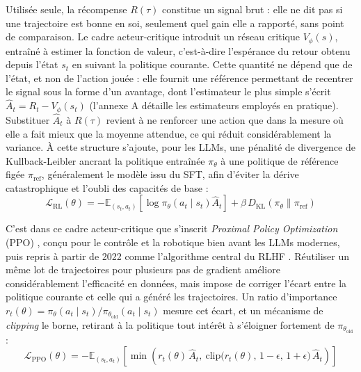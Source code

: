\documentclass[11pt,a4paper]{article}
\begin{document}
Utilisée seule, la récompense $R(\tau)$ constitue un signal brut : elle ne dit pas si une trajectoire est bonne en soi, seulement quel gain elle a rapporté, sans point de comparaison. Le cadre acteur-critique introduit un réseau critique $V_\phi(s)$, entraîné à estimer la fonction de valeur, c'est-à-dire l'espérance du retour obtenu depuis l'état $s_t$ en suivant la politique courante. Cette quantité ne dépend que de l'état, et non de l'action jouée : elle fournit une référence permettant de recentrer le signal sous la forme d'un avantage, dont l'estimateur le plus simple s'écrit $\hat{A}_t = R_t - V_\phi(s_t)$ (l'annexe A détaille les estimateurs employés en pratique). Substituer $\hat{A}_t$ à $R(\tau)$ revient à ne renforcer une action que dans la mesure où elle a fait mieux que la moyenne attendue, ce qui réduit considérablement la variance. À cette structure s'ajoute, pour les LLMs, une pénalité de divergence de Kullback-Leibler ancrant la politique entraînée $\pi_\theta$ à une politique de référence figée $\pi_{\text{ref}}$, généralement le modèle issu du SFT, afin d'éviter la dérive catastrophique et l'oubli des capacités de base :
\begin{equation}
\mathcal{L}_{\text{RL}}(\theta) = -\mathbb{E}_{(s_t, a_t)} \left[ \log \pi_\theta(a_t \mid s_t) \hat{A}_t \right] + \beta \, D_{\text{KL}}(\pi_\theta \parallel \pi_{\text{ref}})
\end{equation}

C'est dans ce cadre acteur-critique que s'inscrit \emph{Proximal Policy Optimization} (PPO) \cite{schulman2017proximal}, conçu pour le contrôle et la robotique bien avant les LLMs modernes, puis repris à partir de 2022 comme l'algorithme central du RLHF \cite{ouyang2022training}. Réutiliser un même lot de trajectoires pour plusieurs pas de gradient améliore considérablement l'efficacité en données, mais impose de corriger l'écart entre la politique courante et celle qui a généré les trajectoires. Un ratio d'importance $r_t(\theta) = \pi_\theta(a_t \mid s_t) / \pi_{\theta_{\text{old}}}(a_t \mid s_t)$ mesure cet écart, et un mécanisme de \emph{clipping} le borne, retirant à la politique tout intérêt à s'éloigner fortement de $\pi_{\theta_{\text{old}}}$ :
\begin{equation}
\mathcal{L}_{\text{PPO}}(\theta) = -\mathbb{E}_{(s_t, a_t)} \left[ \min\left( r_t(\theta)\, \hat{A}_t, \ \text{clip}\big(r_t(\theta),\, 1-\epsilon,\, 1+\epsilon\big)\, \hat{A}_t \right) \right]
\end{equation}
\end{document}
